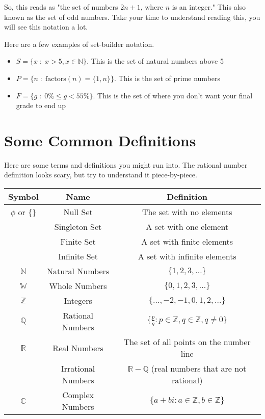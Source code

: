 So, this reads as "the set of numbers $2n+1$, where $n$ is an integer." This also known as the set of odd numbers. Take your time to understand reading this, you will see this notation a lot.

\myexample
{
	Here are a few examples of set-builder notation.
	\begin{itemize}
		\item $S = \{x \;:\; x > 5, x \in \mathbb{N}\}$. This is the set of natural numbers above 5
		\item $P = \{n \;:\; \text{factors}(n) = \{1,n\}\}$. This is the set of prime numbers
		\item $F = \{g \;:\; 0\% \leq g < 55\%\}$. This is the set of where you don't want your final grade to end up
	\end{itemize}
}
	
\section{Some Common Definitions}

Here are some terms and definitions you might run into. The rational number definition looks scary, but try to understand it piece-by-piece.

\begin{tabular}{|c|c|c|}
\hline
Symbol & Name & Definition\\
\hline
$\phi$ or $\{\}$ & Null Set & The set with no elements\\
 & Singleton Set & A set with one element\\
 & Finite Set & A set with finite elements\\
 & Infinite Set & A set with infinite elements\\
$\mathbb{N}$ & Natural Numbers & $\{1,2,3,\dots\}$\\
$\mathbb{W}$ & Whole Numbers & $\{0,1,2,3,\dots\}$\\
$\mathbb{Z}$ & Integers & $\{\dots, -2, -1, 0, 1, 2, \dots\}$\\
$\mathbb{Q}$ & Rational Numbers &
$\displaystyle \bigg\{ \frac{p}{q} : p \in \mathbb{Z}, q \in \mathbb{Z}, q \neq 0 \bigg\}$\\
$\mathbb{R}$ & Real Numbers & The set of all points on the number line\\
	& Irrational Numbers & $\mathbb{R}-\mathbb{Q}$ (real numbers that are not rational)\\
$\mathbb{C}$ & Complex Numbers & $\{a+bi : a \in \mathbb{Z}, b \in \mathbb{Z}\}$\\
\hline
\end{tabular}

